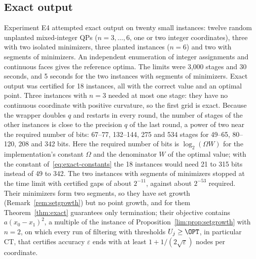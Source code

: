 \subsection{Exact output}\label{sec:comp-exact}
Experiment E4 attempted exact output on twenty small instances: twelve random
unplanted mixed-integer QPs ($n=3,\dots,6$, one or two integer coordinates),
three with two isolated minimizers, three planted instances ($n=6$) and two
with segments of minimizers. An independent enumeration of integer
assignments and continuous faces gives the reference optima. The limits were
3{,}000 stages and 30 seconds, and 5 seconds for the two instances with
segments of minimizers. Exact output was certified for 18 instances, all with
the correct value and an optimal point. Three instances with $n=3$ needed at
most one stage: they have no continuous coordinate with positive curvature,
so the first grid is exact. Because the wrapper doubles $q$ and restarts in
every round, the number of stages of the other instances is close to the
precision $q$ of the last round, a power of two near the required number of
bits: 67--77, 132--144, 275 and 534 stages for 49--65, 80--120, 208 and 342
bits. Here the required number of bits is
$\log_2(\Omega W)$ for the implementation's constant $\Omega$ and the
denominator $W$ of the optimal value; with the constant
of~\eqref{eq:exact-constants} the 18 instances would need 21 to 315 bits
instead of 49 to 342. The two instances with segments of minimizers stopped at the
time limit with certified gaps of about $2^{-11}$, against about $2^{-53}$
required. Their minimizers form two segments, so they have set growth
(Remark~\ref{rem:setgrowth}) but no point growth, and for them
Theorem~\ref{thm:exact} guarantees only termination; their objective contains
$a(x_0-x_1)^2$, a multiple of the instance of
Proposition~\ref{lim:prop:setgrowth} with $n=2$, on which every run of
filtering with thresholds $U_j\ge\OPT$, in particular CT, that certifies
accuracy $\varepsilon$ ends with at least $1+1/(2\sqrt\varepsilon)$ nodes per
coordinate.

